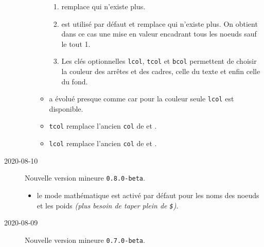 \documentclass[12pt,a4paper]{article}
\begin{document}
\begin{description}
\begin{itemize}[itemsep=.5em]
\begin{itemize}[itemsep=.5em]
\begin{enumerate}
            	\item {} remplace  qui n'existe plus.
    
            	\item {} est utilisé par défaut et remplace  qui n'existe plus. On obtient dans ce cas une mise en valeur encadrant tous les noeuds sauf le tout 1\ier{}.
    
            	\item Les clés optionnelles \verb#lcol#, \verb#tcol# et \verb#bcol# permettent de choisir la couleur des arrêtes et des cadres, celle du texte et enfin celle du fond.
            \end{enumerate}
    
    
            \item {} a évolué presque comme  car pour la couleur seule \verb#lcol# est disponible.
    
    
            \item \verb#tcol# remplace l'ancien \verb#col# de  et .
    
    		\item \verb#lcol# remplace l'ancien \verb#col# de  et .
    
    
    
        \end{itemize}
    \end{itemize}
    
    
    \separation


    \medskip
    \item[2020-08-10] Nouvelle version mineure \verb+0.8.0-beta+.
    
    \begin{itemize}[itemsep=.5em]
        \item {}
              le mode mathématique est activé par défaut pour les noms des noeuds et les poids \emph{(plus besoin de taper plein de \texttt{\$})}.
    \end{itemize}
    
    
    \separation

    \medskip
    \item[2020-08-09] Nouvelle version mineure \verb+0.7.0-beta+.
    

\end{description}
\end{document}
